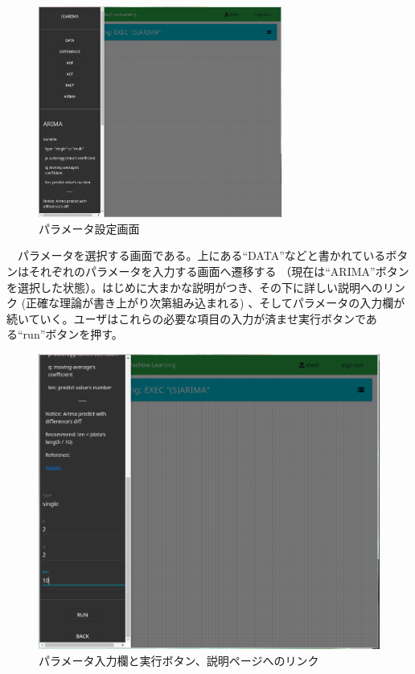 \documentclass[dvipdfmx]{scrartcl}
\begin{document}
\begin{figure}[htbp]
\centering
\includegraphics[width=8cm]{./settings-view.PNG}
\caption{パラメータ設定画面}
\end{figure}

　パラメータを選択する画面である。上にある``DATA''などと書かれているボタンはそれぞれのパラメータを入力する画面へ遷移する （現在は``ARIMA''ボタンを選択した状態）。はじめに大まかな説明がつき、その下に詳しい説明へのリンク (正確な理論が書き上がり次第組み込まれる) 、そしてパラメータの入力欄が続いていく。ユーザはこれらの必要な項目の入力が済ませ実行ボタンである``run''ボタンを押す。\\

\begin{figure}[htbp]
\centering
\includegraphics[width=.9\linewidth]{./settings-view2.PNG}
\caption{パラメータ入力欄と実行ボタン、説明ページへのリンク}
\end{figure}
\end{document}
